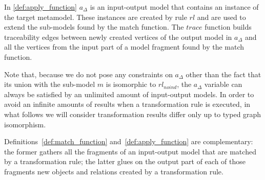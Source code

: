 In \cref{def:apply_function} $a_\Delta$ is an input-output model that contains an instance of the target metamodel. These instances are created by rule $rl$ and are used to extend the sub-models found by the match function. The $trace$ function builds traceability edges between newly created vertices of the output model in $a_{\Delta}$ and all the vertices from the input part of a model fragment found by the match function.

Note that, because we do not pose any constraints on $a_\Delta$ other than the fact that its union with the sub-model $m$ is isomorphic to $rl_{noind}$, the $a_\Delta$ variable can always be satisfied by an unlimited amount of input-output models. In order to avoid an infinite amounts of results when a transformation rule is executed, in what follows we will consider transformation results differ only up to typed graph isomorphism.   


Definitions~\ref{def:match_function} and~\ref{def:apply_function} are complementary: the former gathers all the fragments of an input-output model that are matched by a transformation rule; the latter glues on the output part of each of those fragments new objects and relations created by a transformation rule. 




